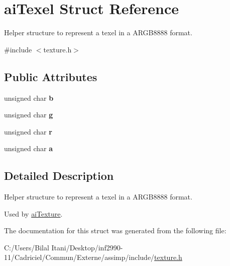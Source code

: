 \hypertarget{structai_texel}{}\section{ai\+Texel Struct Reference}
\label{structai_texel}


Helper structure to represent a texel in a A\+R\+G\+B8888 format.  




{\ttfamily \#include $<$texture.\+h$>$}

\subsection*{Public Attributes}
\begin{DoxyCompactItemize}
\item 
unsigned char {\bfseries b}\hypertarget{structai_texel_a5b4f97f69cf59cb9065af67389599ba6}{}\label{structai_texel_a5b4f97f69cf59cb9065af67389599ba6}

\item 
unsigned char {\bfseries g}\hypertarget{structai_texel_a41da3516b8241165e4ca58ea8ed68fe6}{}\label{structai_texel_a41da3516b8241165e4ca58ea8ed68fe6}

\item 
unsigned char {\bfseries r}\hypertarget{structai_texel_ae9408c0d18f6ff597715cc626398a0ff}{}\label{structai_texel_ae9408c0d18f6ff597715cc626398a0ff}

\item 
unsigned char {\bfseries a}\hypertarget{structai_texel_a6d4450e83b02b29d24f7aab27958034e}{}\label{structai_texel_a6d4450e83b02b29d24f7aab27958034e}

\end{DoxyCompactItemize}


\subsection{Detailed Description}
Helper structure to represent a texel in a A\+R\+G\+B8888 format. 

Used by \hyperlink{structai_texture}{ai\+Texture}. 

The documentation for this struct was generated from the following file\+:\begin{DoxyCompactItemize}
\item 
C\+:/\+Users/\+Bilal Itani/\+Desktop/inf2990-\/11/\+Cadriciel/\+Commun/\+Externe/assimp/include/\hyperlink{texture_8h}{texture.\+h}\end{DoxyCompactItemize}
